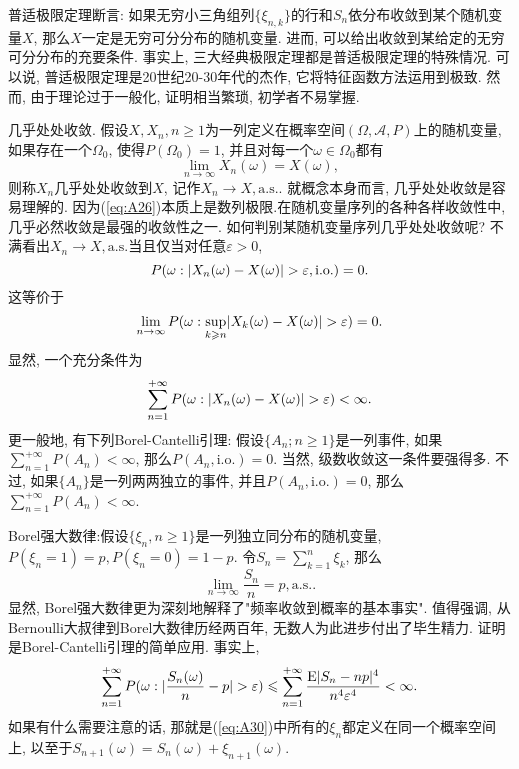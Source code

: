 普适极限定理断言: 如果无穷小三角组列$\{\xi_{n,k}\}$的行和$S_n$依分布收敛到某个随机变量$X$, 那么$X$一定是无穷可分分布的随机变量. 进而, 可以给出收敛到某给定的无穷可分分布的充要条件. 事实上, 三大经典极限定理都是普适极限定理的特殊情况. 可以说, 普适极限定理是20世纪20-30年代的杰作, 它将特征函数方法运用到极致. 然而, 由于理论过于一般化, 证明相当繁琐, 初学者不易掌握.

几乎处处收敛. 假设$X,X_n,n\geqslant 1$为一列定义在概率空间$(\Omega,\mathscr{A},P)$上的随机变量, 如果存在一个$\Omega_0$, 使得$P(\Omega_0) = 1$, 并且对每一个$\omega\in\Omega_0$都有
\begin{equation}\label{eq:A26}
\lim_{n\to\infty}X_n(\omega) = X(\omega),
\end{equation}
则称$X_n$几乎处处收敛到$X$, 记作$X_n\to X,\mathrm{a.s.}$. 就概念本身而言, 几乎处处收敛是容易理解的. 因为(\ref{eq:A26})本质上是数列极限.在随机变量序列的各种各样收敛性中, 几乎必然收敛是最强的收敛性之一. 如何判别某随机变量序列几乎处处收敛呢? 不满看出$X_n\to X,\mathrm{a.s.}$当且仅当对任意$\varepsilon>0$,
\begin{equation}\label{eq:A27}
P(\omega:\lvert X_n(\omega)-X(\omega)\rvert>\varepsilon,\mathrm{i.o.}) = 0.
\end{equation}
这等价于\begin{equation}\label{eq:A28}
\lim_{n\to\infty}P(\omega:\sup_{k\geqslant n}\lvert X_k(\omega)-X(\omega)\rvert>\varepsilon) = 0.
\end{equation}
显然, 一个充分条件为\begin{equation}\label{eq:A29}
\sum_{n = 1}^{+\infty}P(\omega:\lvert X_n(\omega)-X(\omega)\rvert>\varepsilon)<\infty.
\end{equation}
更一般地, 有下列Borel-Cantelli引理: 假设$\{A_n;n\geqslant 1\}$是一列事件, 如果$\sum_{n =1}^{+\infty}P(A_n)<\infty$, 那么$P(A_n,\mathrm{i.o.}) = 0$. 当然, 级数收敛这一条件要强得多. 不过, 如果$\{A_n\}$是一列两两独立的事件, 并且$P(A_n,\mathrm{i.o.}) = 0$, 那么$\sum_{n = 1}^{+\infty}P(A_n)<\infty$.

Borel强大数律:假设$\{\xi_n,n\geqslant 1\}$是一列独立同分布的随机变量, $P(\xi_n = 1) = p,P(\xi_n = 0) =1-p$. 令$S_n = \sum_{k=1}^n\xi_k$, 那么\begin{equation}\label{eq:A30}
\lim_{n\to\infty}\frac{S_n}{n} = p,\mathrm{a.s.}.
\end{equation}
显然, Borel强大数律更为深刻地解释了"频率收敛到概率的基本事实". 值得强调, 从Bernoulli大叔律到Borel大数律历经两百年, 无数人为此进步付出了毕生精力. 证明是Borel-Cantelli引理的简单应用. 事实上,
\begin{equation}\label{eq:A31}
\sum_{n = 1}^{+\infty}P(\omega:\lvert\frac{S_n(\omega)}{n}-p\rvert>\varepsilon)\leqslant \sum_{n = 1}^{+\infty}\frac{\mathrm{E}\lvert S_n-np\rvert^4}{n^4\varepsilon^4}<\infty.
\end{equation}
如果有什么需要注意的话, 那就是(\ref{eq:A30})中所有的$\xi_n$都定义在同一个概率空间上, 以至于$S_{n+1}(\omega) = S_{n}(\omega)+\xi_{n+1}(\omega)$.

